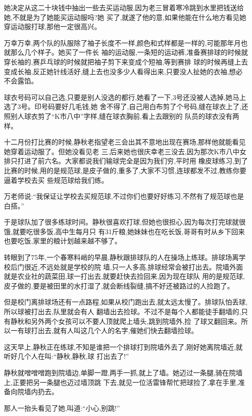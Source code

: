 ﻿\documentclass[12pt]{article}
\begin{document}
她决定从这二十块钱中抽出一些去买运动服,因为老三冒着寒冷跳到水里把钱送给她,不就是为了她能买运动服吗?她
买了,就遂了他的意,如果他能在什么地方看见她穿运动服打球,那他一定很高兴。

万幸万幸,两个队的队服除了袖子长度不一样,颜色和式样都是一样的,可能那年月也就那么几个样子。她买了一件长
袖的运动服,一条短的运动裤,准备赛排球的时候就穿长袖的,赛乒乓球的时候就把袖子剪下来变成个短袖,等到赛排
球的时候再缝上去变成长袖,反正她针线活好,缝上去也没多少人看得出来,只要没人扯她的衣袖,想必不会露馅。

球衣号码可以自己选,只要是别人没选的都行,她看了一下,3号还没被人选掉,她马上选了3号。印号码要好几毛钱,她
舍不得了,自己用白布剪了个号码,缝在球衣上了,还照别人球衣剪了``K市八中''字样,缝在球衣胸前,看上去跟别的
队员的球衣没有两样。

十二月份打比赛的时候,静秋老指望老三会出其不意地出现在赛场,那样他就能看见她穿着运动服了。但她没看见老
三,后来她也很庆幸老三没去,因为那次K市八中女排只打进了前六名。大家都说我们输球完全是因为我们穷,平时用
橡皮球练习,到了比赛的时候,用的是规范球,是皮子做的,重多了,大家不习惯,连球都发不过,教练你要逼着学校去买
些规范球给我们练。

万老师说:``我保证让学校去买规范球,不过你们也要好好练习,不然有了规范球也是白搭。''

于是球队加了很多练球时间。静秋很喜欢打球,但她也很担心,因为每次打完球就很饿,就要吃很多饭,高中生每月只
有31斤粮,她妹妹也在吃长饭,哥哥有时从乡下回来也要吃饭,家里的粮计划越来越不够了。

转眼到了75年,一个春寒料峭的早晨,静秋跟排球队的人在操场上练球。排球场离学校后门很近,不远处就是学校的院
墙,只一人多高,排球经常会被打出去。院墙外面就是农业社的蔬菜田,球一打出去,就要赶快去捡回来,因为现在球队
用的是规范球,皮子做的,要是被田里的水打湿了,就会断线裂缝,搞不好还被路过的人捡跑了。

但是校门离排球场还有一点路程,如果从校门跑出去,就太远太慢了。排球队怕丢球,所以球被打出去,队里就会有人
翻墙出去捡球。不过不是每个人都能徒手翻墙的,只有静秋和另外两个女孩可以不要人顶就爬上墙头,跳到院墙外,捡
了球又翻回来。所以一有球打出去,就有人叫这几个人的名字,催她们快去翻墙捡球。

这天早上,静秋正在练球,不知是谁把一个排球打到院墙外去了,刚好她离院墙近,就听好几个人在叫:``静秋,静秋,球
打出去了!''

静秋就噌噌噌跑到院墙边,单脚一蹬,两手一抓,就上了墙。她迈过一条腿,骑在院墙上,正要把另一条腿也迈过墙顶跳
下去,就见一位活雷锋帮忙把球捡了,拿在手里,准备向院墙内扔去。

那人一抬头看见了她,叫道:``小心,别跳!''
\end{document}

